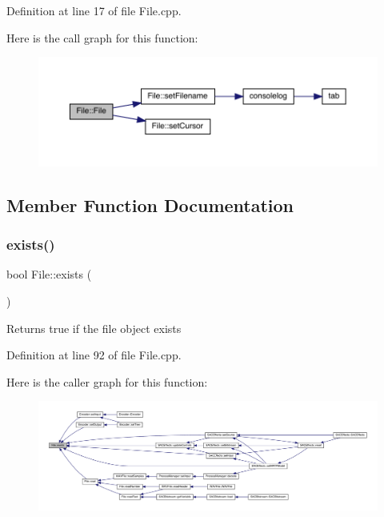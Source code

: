 Definition at line 17 of file File.\+cpp.

Here is the call graph for this function\+:
\nopagebreak
\begin{figure}[H]
\begin{center}
\leavevmode
\includegraphics[width=350pt]{class_file_a8fedf48254fb2b7087fe82369301f6e6_cgraph}
\end{center}
\end{figure}


\subsection{Member Function Documentation}
\mbox{\label{class_file_a4260fca380a387a8347b83bb4bee91b5}} 
\subsubsection{\texorpdfstring{exists()}{exists()}}
{\footnotesize\ttfamily bool File\+::exists (\begin{DoxyParamCaption}{ }\end{DoxyParamCaption})}

\begin{DoxyReturn}{Returns}
true if the file object exists 
\end{DoxyReturn}


Definition at line 92 of file File.\+cpp.

Here is the caller graph for this function\+:
\nopagebreak
\begin{figure}[H]
\begin{center}
\leavevmode
\includegraphics[width=350pt]{class_file_a4260fca380a387a8347b83bb4bee91b5_icgraph}
\end{center}
\end{figure}
\mbox{\label{class_file_a59701204411c5672fc35a95e31b002b3}} 
